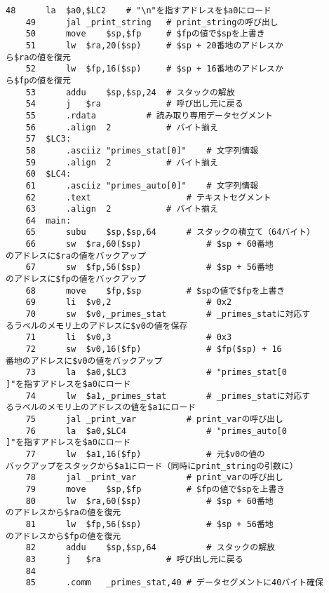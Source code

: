 \begin{Verbatim}[fontsize=\small, baselinestretch=0.8]
    48		la	$a0,$LC2	# "\n"を指すアドレスを$a0にロード
    49		jal	_print_string	# print_stringの呼び出し
    50		move	$sp,$fp		# $fpの値で$spを上書き
    51		lw	$ra,20($sp)		# $sp + 20番地のアドレスか
ら$raの値を復元
    52		lw	$fp,16($sp)		# $sp + 16番地のアドレスか
ら$fpの値を復元
    53		addu	$sp,$sp,24	# スタックの解放
    54		j	$ra				# 呼び出し元に戻る
    55		.rdata			# 読み取り専用データセグメント
    56		.align	2			# バイト揃え
    57	$LC3:
    58		.asciiz	"primes_stat[0]"	# 文字列情報
    59		.align	2			# バイト揃え
    60	$LC4:
    61		.asciiz	"primes_auto[0]"	# 文字列情報
    62		.text					# テキストセグメント
    63		.align	2			# バイト揃え
    64	main:
    65		subu	$sp,$sp,64		# スタックの積立て（64バイト）
    66		sw	$ra,60($sp)				# $sp + 60番地
のアドレスに$raの値をバックアップ
    67		sw	$fp,56($sp)				# $sp + 56番地
のアドレスに$fpの値をバックアップ
    68		move	$fp,$sp			# $spの値で$fpを上書き
    69		li	$v0,2					# 0x2
    70		sw	$v0,_primes_stat		# _primes_statに対応す
るラベルのメモリ上のアドレスに$v0の値を保存
    71		li	$v0,3					# 0x3
    72		sw	$v0,16($fp)				# $fp($sp) + 16
番地のアドレスに$v0の値をバックアップ
    73		la	$a0,$LC3				# "primes_stat[0
]"を指すアドレスを$a0にロード
    74		lw	$a1,_primes_stat		# _primes_statに対応す
るラベルのメモリ上のアドレスの値を$a1にロード
    75		jal	_print_var			# print_varの呼び出し
    76		la	$a0,$LC4				# "primes_auto[0
]"を指すアドレスを$a0にロード
    77		lw	$a1,16($fp)				# 元$v0の値の
バックアップをスタックから$a1にロード（同時にprint_stringの引数に）
    78		jal	_print_var			# print_varの呼び出し
    79		move	$sp,$fp			# $fpの値で$spを上書き
    80		lw	$ra,60($sp)				# $sp + 60番地
のアドレスから$raの値を復元
    81		lw	$fp,56($sp)				# $sp + 56番地
のアドレスから$fpの値を復元
    82		addu	$sp,$sp,64			# スタックの解放
    83		j	$ra				# 呼び出し元に戻る
    84	
    85		.comm	_primes_stat,40	# データセグメントに40バイト確保

\end{Verbatim}


